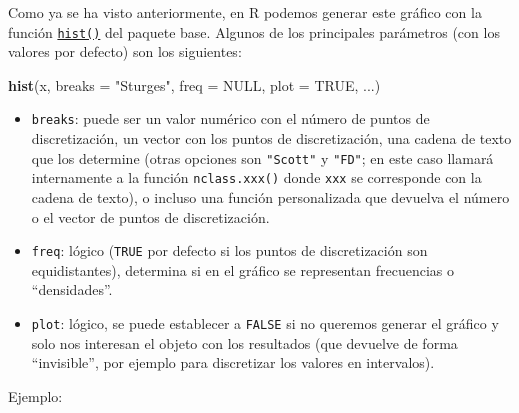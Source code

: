 \documentclass[
  spanish,
  10pt,
]{book}
\newenvironment{Shaded}{\begin{snugshade}}{\end{snugshade}}
\newcommand{\AttributeTok}[1]{\textcolor[rgb]{0.13,0.29,0.53}{#1}}
\newcommand{\ConstantTok}[1]{\textcolor[rgb]{0.56,0.35,0.01}{#1}}
\newcommand{\FunctionTok}[1]{\textcolor[rgb]{0.13,0.29,0.53}{\textbf{#1}}}
\newcommand{\NormalTok}[1]{#1}
\newcommand{\StringTok}[1]{\textcolor[rgb]{0.31,0.60,0.02}{#1}}
\theoremstyle{break}
\theoremstyle{nonumberplain}
\begin{document}
Como ya se ha visto anteriormente, en R podemos generar este gráfico con la función \href{https://rdrr.io/r/graphics/hist.html}{\texttt{hist()}} del paquete base.
Algunos de los principales parámetros (con los valores por defecto) son los siguientes:

\begin{Shaded}
\begin{Highlighting}[]
\FunctionTok{hist}\NormalTok{(x, }\AttributeTok{breaks =} \StringTok{"Sturges"}\NormalTok{, }\AttributeTok{freq =} \ConstantTok{NULL}\NormalTok{, }\AttributeTok{plot =} \ConstantTok{TRUE}\NormalTok{, ...)}
\end{Highlighting}
\end{Shaded}

\begin{itemize}
\item
  \texttt{breaks}: puede ser un valor numérico con el número de puntos de discretización, un vector con los puntos de discretización, una cadena de texto que los determine (otras opciones son \texttt{"Scott"} y \texttt{"FD"}; en este caso llamará internamente a la función \texttt{nclass.xxx()} donde \texttt{xxx} se corresponde con la cadena de texto), o incluso una función personalizada que devuelva el número o el vector de puntos de discretización.
\item
  \texttt{freq}: lógico (\texttt{TRUE} por defecto si los puntos de discretización son equidistantes), determina si en el gráfico se representan frecuencias o ``densidades''.
\item
  \texttt{plot}: lógico, se puede establecer a \texttt{FALSE} si no queremos generar el gráfico y solo nos interesan el objeto con los resultados (que devuelve de forma ``invisible'', por ejemplo para discretizar los valores en intervalos).
\end{itemize}

Ejemplo:
\end{document}
